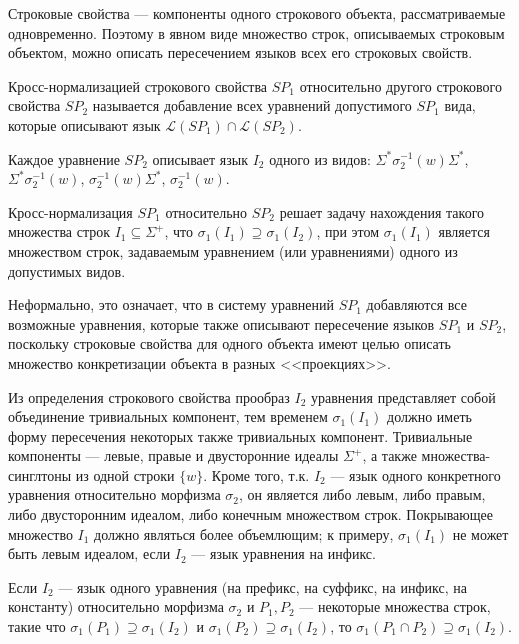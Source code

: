 \documentclass[fontsize=14pt]{scrartcl}
\newcommand{\Lang}{\mathcal{L}}
\begin{document}
Строковые свойства --- компоненты одного строкового объекта, рассматриваемые одновременно. Поэтому в явном виде
множество строк, описываемых строковым объектом, можно описать пересечением 
языков всех его строковых свойств.

\begin{Definition}
Кросс-нормализацией строкового свойства $SP_1$ относительно другого строкового свойства $SP_2$ называется 
добавление всех уравнений допустимого $SP_1$ вида, которые описывают язык $\Lang(SP_1) \cap \Lang(SP_2)$. 
\end{Definition}

Каждое уравнение $SP_2$ описывает язык $I_2$ одного из видов: $\Sigma^* \sigma_2^{-1}(w) \Sigma^*$,
$\Sigma^* \sigma_2^{-1}(w)$, $\sigma_2^{-1}(w) \Sigma^*$, $\sigma_2^{-1}(w)$.

Кросс-нормализация $SP_1$ относительно $SP_2$ решает задачу нахождения такого множества строк $I_1 \subseteq \Sigma^+$, что
$\sigma_1(I_1) \supseteq \sigma_1(I_2)$, при этом $\sigma_1(I_1)$ является множеством строк, задаваемым уравнением (или уравнениями) одного из
допустимых видов.

Неформально, это означает, что в систему уравнений $SP_1$ добавляются все возможные уравнения, которые также 
описывают пересечение языков $SP_1$ и $SP_2$, поскольку строковые свойства для одного объекта имеют целью описать 
множество конкретизации объекта в разных <<проекциях>>.

Из определения строкового свойства прообраз $I_2$ уравнения представляет собой объединение тривиальных компонент, тем временем $\sigma_1(I_1)$
должно иметь форму пересечения некоторых также тривиальных компонент. Тривиальные компоненты --- левые, правые и двусторонние идеалы $\Sigma^+$, 
а также множества-синглтоны из одной строки $\{w\}$. Кроме того, т.к. $I_2$ --- язык одного конкретного уравнения относительно морфизма $\sigma_2$,
он является либо левым, либо правым, либо двусторонним идеалом, либо конечным множеством строк. Покрывающее множество $I_1$
должно являться более объемлющим; к примеру, $\sigma_1(I_1)$ не может быть левым идеалом, если $I_2$ --- язык уравнения на инфикс.

\begin{Proposition}
Если $I_2$ --- язык одного уравнения (на префикс, на суффикс, на инфикс, на константу) относительно морфизма $\sigma_2$ и 
$P_1, P_2$ --- некоторые множества строк, такие что $\sigma_1(P_1) \supseteq \sigma_1(I_2)$ и $\sigma_1(P_2) \supseteq \sigma_1(I_2)$, то 
$\sigma_1(P_1 \cap P_2) \supseteq \sigma_1(I_2)$.
\end{Proposition}
\end{document}
